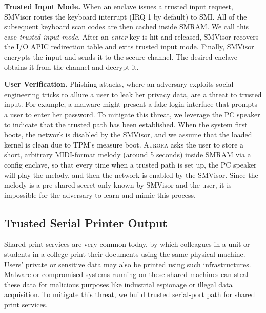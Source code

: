 \documentclass[journal,twocolumn,letterpaper,10pt]{IEEEtran}
\begin{document}
\textbf{Trusted Input Mode.}
When an enclave issues a trusted input request, SMVisor routes the keyboard interrupt (IRQ 1 by default) to SMI. All of the subsequent keyboard scan codes are then cached inside SMRAM. We call this case \emph{trusted input mode}. After an \emph{enter} key is hit and released, SMVisor recovers the I/O APIC redirection table and exits trusted input mode. Finally, SMVisor encrypts the input and sends it to the secure channel. The desired enclave obtains it from the channel and decrypt it.

\textbf{User Verification.}
Phishing attacks, where an adversary exploits social engineering tricks to allure a user to leak her privacy data, are a threat to trusted input. For example, a malware might present a fake login interface that prompts a user to enter her password.
To mitigate this threat, we leverage the PC speaker to indicate that the trusted path has been established.
When the system first boots, the network is disabled by the SMVisor, and we assume that the loaded kernel is clean due to TPM's measure boot. \textsc{Aurora} asks the user to store a short, arbitrary MIDI-format melody (around 5 seconds) inside SMRAM via a config enclave, so that every time when a trusted path is set up, the PC speaker will play the melody, and then the network is enabled by the SMVisor. Since the melody is a pre-shared secret only known by SMVisor and the user, it is impossible for the adversary to learn and mimic this process.

\subsection{Trusted Serial Printer Output}\label{output_service}
Shared print services are very common today, by which colleagues in a unit or students in a college print their documents using the same physical machine. Users' private or sensitive data may also be printed using such infrastructures. Malware or compromised systems running on these shared machines can steal these data for malicious purposes like industrial espionage or illegal data acquisition. To mitigate this threat, we build trusted serial-port path for shared print services.
\end{document}
